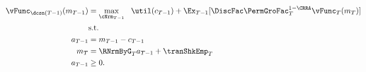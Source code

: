 \begin{equation*}\begin{gathered}\begin{aligned}
{\vFunc}_{\dcsn(T-1)}(m_{T-1})  & = \max_{\cNrm_{T-1}} ~~ \util(c_{T-1}) + \Ex_{T-1} [\DiscFac \PermGroFac_{T}^{1-\CRRA}\vFunc_{T}(m_{T})] \label{eq:ConstrArt}
\\ & \mbox{s.t.}  \nonumber
\\ a_{T-1}  & = m_{T-1} - c_{T-1}
\\ m_{T}  & = \RNrmByG_{T} a_{T-1} + \tranShkEmp_{T}
\\ a_{T-1} & \geq  0 .
\end{aligned}\end{gathered}\end{equation*}
